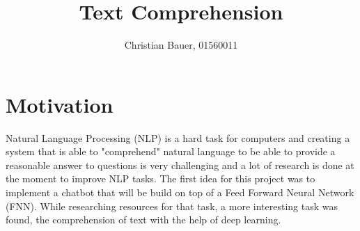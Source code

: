 \usepackage{wrapfig}

\title{Text Comprehension}
\author{Christian Bauer, 01560011}
\date{}

% 
% 




\maketitle



\tableofcontents
    
\pagebreak

    \section{Motivation}
    \label{sec:motivation}


        Natural Language Processing (NLP) is a hard task for computers and creating a system that is able to "comprehend" natural language to be able to provide a reasonable answer to questions is very challenging and a lot of research is done at the moment to improve NLP tasks.
        The first idea for this project was to implement a chatbot that will be build on top of a Feed Forward Neural Network (FNN).
        While researching resources for that task, a more interesting task was found, the comprehension of text with the help of deep learning.

